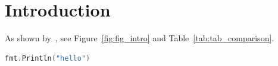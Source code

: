 \section{Introduction}

As shown by~\cite{doe2023}, see Figure~\ref{fig:fig_intro} and Table~\ref{tab:tab_comparison}.

\begin{lstlisting}[language=go]
fmt.Println("hello")
\end{lstlisting}

